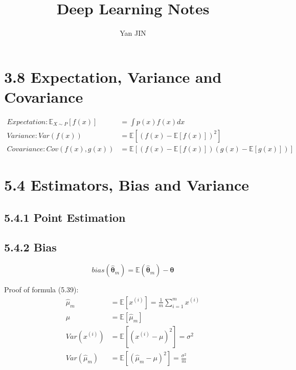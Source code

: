 \documentclass[12pt]{article}
\numberwithin{equation}{section}
\begin{document}
\small
  \renewcommand\figurename{Fig.}
    \title{Deep Learning\cite{Goodfellow-et-al-2016-Book} Notes}
    \author{Yan JIN}
    \pagestyle{fancy}\fancyhf{}
    \lhead{}
    \lfoot{\textit{}}\cfoot{}\rfoot{\thepage}
    \renewcommand{\headrulewidth}{1.pt}
    \renewcommand{\footrulewidth}{1.pt}
  \maketitle

\section{3.8 Expectation, Variance and Covariance}
\begin{align*}
Expectation: \mathbb{E}_{X \sim P}[f(x)]&=\int p(x)f(x)dx \\
Variance: Var(f(x))&=\mathbb{E}[(f(x)-\mathbb{E}[f(x)])^2] \\
Covariance: Cov(f(x),g(x))&=\mathbb{E}[(f(x)-\mathbb{E}[f(x)])(g(x)-\mathbb{E}[g(x)])]
\end{align*}
\section{5.4 Estimators, Bias and Variance}
\subsection{5.4.1 Point Estimation}
\subsection{5.4.2 Bias}
\[ bias(\hat{{\boldsymbol\theta}}_m)=\mathbb{E}(\hat{\boldsymbol\theta}_m)-\boldsymbol\theta
\]

Proof of formula (5.39):
\begin{align*}
\hat{\mu}_m&=\mathbb{E}[x^{(i)}]=\frac{1}{m}\sum_{i=1}^{m}x^{(i)} \\
\mu&=\mathbb{E}[\hat{\mu}_m] \\
Var(x^{(i)})&=\mathbb{E}[(x^{(i)}-\mu)^2]=\sigma^2 \\
Var(\hat{\mu}_m)&=\mathbb{E}[(\hat{\mu}_m-\mu)^2] =\frac{\sigma^2}{m}
\end{align*}
\end{document}
